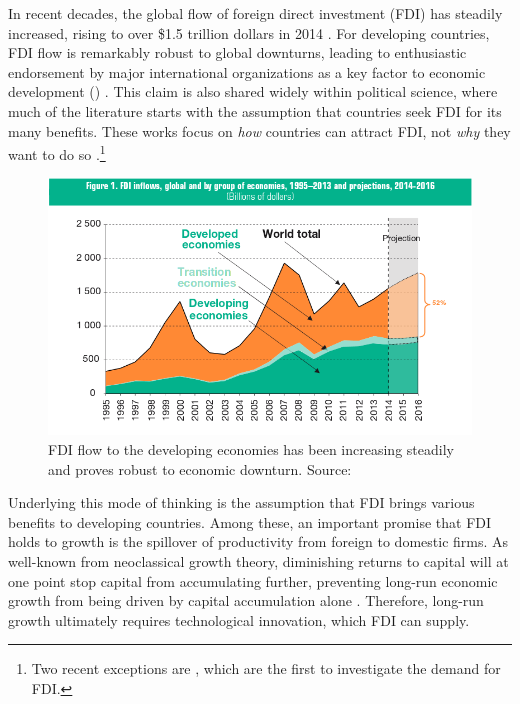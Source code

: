 In recent decades, the global flow of foreign direct investment (FDI) has steadily increased, rising to over \$1.5 trillion dollars in 2014 \citep{UNCTAD2014}. For developing countries, FDI flow is remarkably robust to global downturns, leading to enthusiastic endorsement by major international organizations as a key factor to economic development () \citep{Mallampally1999, WorldEconomicForum2013}. This claim is also shared widely within political science, where much of the literature starts with the assumption that countries seek FDI for its many benefits. These works focus on \textit{how} countries can attract FDI, not \textit{why} they want to do so \citep{Jensen2003, Li2003, Li2006, Ahlquist2006}.\footnote{Two recent exceptions are \citet{Pinto2013, Pandya2013}, which are the first to investigate the demand for FDI.} 

\begin{figure}[!ht]
\includegraphics[width=\textwidth, height=\textheight,keepaspectratio]{../figure/global_fdi}
\caption{FDI flow to the developing economies has been increasing steadily and proves robust to economic downturn. Source: \citet[xiii]{UNCTAD2014}}
\label{fig:globalfdi}
\end{figure}

Underlying this mode of thinking is the assumption that FDI brings various benefits to developing countries. Among these, an important promise that FDI holds to growth is the spillover of productivity from foreign to domestic firms. As well-known from neoclassical growth theory, diminishing returns to capital will at one point stop capital from accumulating further, preventing long-run economic growth from being driven by capital accumulation alone \citep{Solow1956}. Therefore, long-run growth ultimately requires technological innovation, which FDI can supply.

